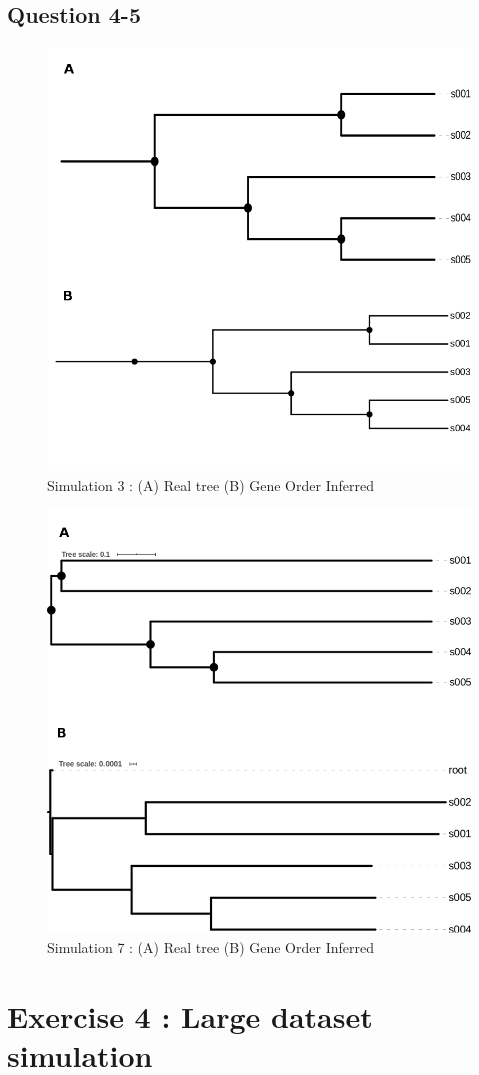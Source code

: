 \documentclass[]{article}
\theoremstyle{definition}
\begin{document}
\newpage
\subsection{Question 4-5}

\begin{figure}[h]
	\centering
	\includegraphics*[width = 0.5\linewidth]{image/new/tree3.png}
	\caption{ Simulation 3 :  (A) Real tree (B) Gene Order Inferred }
\end{figure}

\begin{figure}[h]
	\centering
	\includegraphics*[width = 0.5\linewidth]{image/new/tree7.png}
	\caption{ Simulation 7 :  (A) Real tree (B) Gene Order Inferred }
\end{figure}

\section{Exercise 4 : Large dataset simulation}
\end{document}
